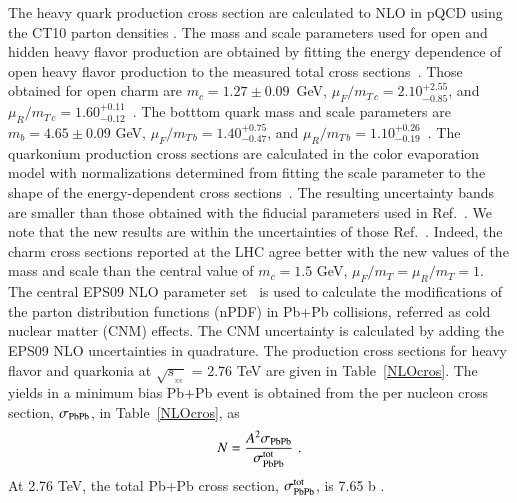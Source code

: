 The heavy quark production cross section are calculated to NLO in pQCD  
using the CT10 parton densities \cite{Lai:2010vv}. The mass and scale parameters used 
for open and hidden heavy flavor production are obtained by fitting the energy dependence 
of open heavy flavor production to the measured total cross sections~\cite{Nelson:2012bc,Nelson:Future}.
Those obtained for open charm are $m_c = 1.27 \pm 0.09$~GeV,
$\mu_F/m_{T\,c} = 2.10 ^{+2.55}_{-0.85}$, and $\mu_R/m_{T\, c} = 1.60 ^{+0.11}_{-0.12}$~\cite{Nelson:2012bc}. 
The botttom quark mass and scale parameters are $m_b = 4.65 \pm 0.09$ GeV,
$\mu_F/m_{T\, b} = 1.40^{+0.75}_{-0.47}$, and $\mu_R/m_{T\, b} = 1.10^{+0.26}_{-0.19}$~\cite{Nelson:Future}.
The quarkonium production cross sections are calculated in the color evaporation model with
normalizations determined from fitting the scale parameter to the shape of the energy-dependent
cross sections~\cite{Nelson:2012bc,Nelson:Future}. The resulting uncertainty bands are smaller 
than those obtained with the fiducial parameters used in Ref.~\cite{Cacciari:2005rk}.
We note that the new results are within the uncertainties of those Ref.~\cite{Cacciari:2005rk}.  
Indeed, the charm cross sections reported at the LHC agree
better with the new values of the mass and scale than the central value of $m_c = 1.5$ GeV,
$\mu_F/m_T = \mu_R/m_T = 1$. The central EPS09 NLO parameter set~\cite{Eskola:2009uj} is used to 
calculate the modifications of the parton distribution functions (nPDF) in 
Pb+Pb collisions, referred as cold nuclear matter (CNM) effects. The CNM uncertainty is 
calculated by adding the EPS09 NLO uncertainties in quadrature.%
The production cross sections for heavy flavor and quarkonia at $\sqrt{s_{_{_{NN}}}}$ = 2.76 
TeV \cite{Kumar:2012qx} are given in Table~\ref{NLOcros}.  The yields in a minimum bias 
Pb+Pb event is obtained from the per nucleon cross
section, $\sigma_{\rm PbPb}$, in Table~\ref{NLOcros}, as
\begin{eqnarray}
N = {A^2 \sigma_{\rm PbPb} \over  
\sigma_{\rm PbPb}^{\rm tot}} \, \, .
\end{eqnarray}
 At 2.76 TeV, the total Pb+Pb cross section, $\sigma_{\rm PbPb}^{\rm tot}$, 
is 7.65 b \cite{Chatrchyan:2011sx}.


